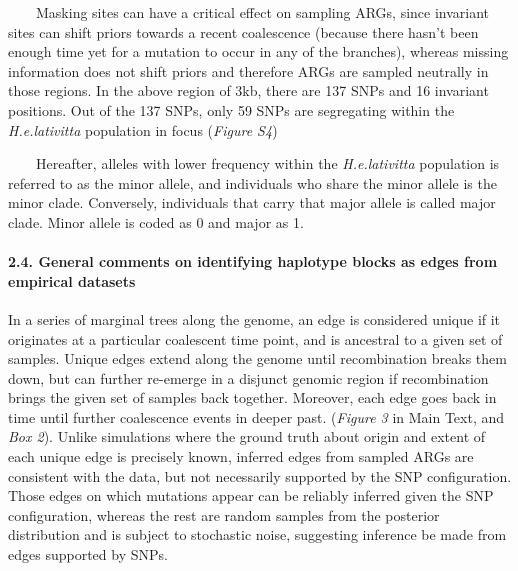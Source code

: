\documentclass[
]{article}
\begin{document}
  Masking sites can have a critical effect on sampling ARGs, since
invariant sites can shift priors towards a recent coalescence (because
there hasn't been enough time yet for a mutation to occur in any of the
branches), whereas missing information does not shift priors and
therefore ARGs are sampled neutrally in those regions. In the above
region of 3kb, there are 137 SNPs and 16 invariant positions. Out of the
137 SNPs, only 59 SNPs are segregating within the \emph{H.e.lativitta}
population in focus (\emph{Figure S4})

  Hereafter, alleles with lower frequency within the
\emph{H.e.lativitta} population is referred to as the minor allele, and
individuals who share the minor allele is the minor clade. Conversely,
individuals that carry that major allele is called major clade. Minor
allele is coded as 0 and major as 1.

\hypertarget{general-comments-on-identifying-haplotype-blocks-as-edges-from-empirical-datasets}{%
\paragraph{\texorpdfstring{2.4. General comments on identifying
haplotype blocks as edges from empirical datasets\\
}{2.4. General comments on identifying haplotype blocks as edges from empirical datasets }}\label{general-comments-on-identifying-haplotype-blocks-as-edges-from-empirical-datasets}}

\hfill\break
In a series of marginal trees along the genome, an edge is considered
unique if it originates at a particular coalescent time point, and is
ancestral to a given set of samples. Unique edges extend along the
genome until recombination breaks them down, but can further re-emerge
in a disjunct genomic region if recombination brings the given set of
samples back together. Moreover, each edge goes back in time until
further coalescence events in deeper past. (\emph{Figure 3} in Main
Text, and \emph{Box 2}). Unlike simulations where the ground truth about
origin and extent of each unique edge is precisely known, inferred edges
from sampled ARGs are consistent with the data, but not necessarily
supported by the SNP configuration. Those edges on which mutations
appear can be reliably inferred given the SNP configuration, whereas the
rest are random samples from the posterior distribution and is subject
to stochastic noise, suggesting inference be made from edges supported
by SNPs.
\end{document}
